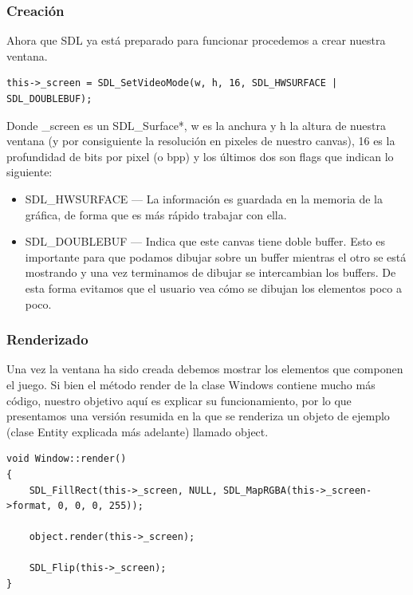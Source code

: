 \documentclass[parskip=half*]{scrartcl}
\begin{document}
			\subsubsection{Creaci\'on}
				Ahora que SDL ya est\'a preparado para funcionar procedemos a crear nuestra ventana.

				\begin{lstlisting}
this->_screen = SDL_SetVideoMode(w, h, 16, SDL_HWSURFACE | SDL_DOUBLEBUF);
				\end{lstlisting}

				Donde \_screen es un SDL\_Surface*, w es la anchura y h la altura de nuestra ventana (y por consiguiente la resoluci\'on en pixeles de nuestro canvas), 16 es la profundidad de bits por pixel (o bpp) y los \'ultimos dos son flags que indican lo siguiente:

				\begin{itemize}
					\item SDL\_HWSURFACE --- La informaci\'on es guardada en la memoria de la gr\'afica, de forma que es m\'as r\'apido trabajar con ella.

					\item SDL\_DOUBLEBUF --- Indica que este canvas tiene doble buffer. Esto es importante para que podamos dibujar sobre un buffer mientras el otro se est\'a mostrando y una vez terminamos de dibujar se intercambian los buffers. De esta forma evitamos que el usuario vea c\'omo se dibujan los elementos poco a poco.
				\end{itemize}

			\subsubsection{Renderizado}
				Una vez la ventana ha sido creada debemos mostrar los elementos que componen el juego. Si bien el m\'etodo render de la clase Windows contiene mucho m\'as c\'odigo, nuestro objetivo aqu\'i es explicar su funcionamiento, por lo que presentamos una versi\'on resumida en la que se renderiza un objeto de ejemplo (clase Entity explicada m\'as adelante) llamado object.

				\begin{lstlisting}
void Window::render()
{
    SDL_FillRect(this->_screen, NULL, SDL_MapRGBA(this->_screen->format, 0, 0, 0, 255));

    object.render(this->_screen);
    
    SDL_Flip(this->_screen);
}
				\end{lstlisting}
\end{document}
